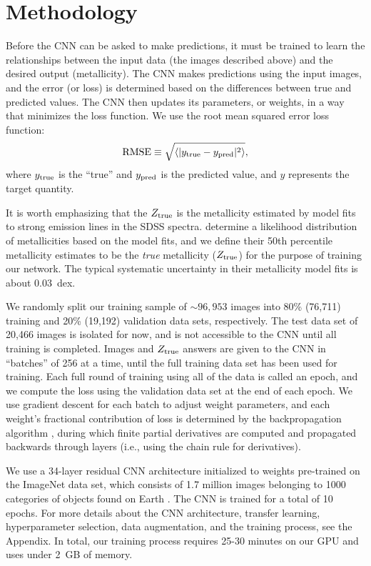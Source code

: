 \documentclass[fleqn,usenatbib]{mnras}
\begin{document}
\section{Methodology}\label{sec:training}
Before the CNN can be asked to make predictions, it must be trained to learn the relationships between the input data (the images described above) and the desired output (metallicity). The CNN makes predictions using the input images, and the error (or loss) is determined based on the differences between true and predicted values. The CNN then updates its parameters, or weights, in a way that minimizes the loss function. We use the root mean squared error loss function:
\begin{equation} \label{eq:rmse}
\mathrm{RMSE} \equiv \sqrt{\langle |y_{\rm true} - y_{\rm pred}|^2\rangle},
\end{equation}
where $y_{\rm true}$ is the ``true'' and $y_{\rm pred}$ is the predicted value, and $y$ represents the target quantity.

It is worth emphasizing that the $Z_{\rm true}$ is the metallicity estimated by model fits to strong emission lines in the SDSS spectra. \cite{Tremonti2004} determine a likelihood distribution of metallicities based on the model fits, and we define their 50th percentile metallicity estimates to be the \textit{true} metallicity ($Z_{\rm true}$) for the purpose of training our network. The typical systematic uncertainty in their metallicity model fits is about 0.03~dex.

We randomly split our training sample of $\sim 96,953$ images into 80\% (76,711) training and 20\% (19,192) validation data sets, respectively. The test data set of 20,466 images is isolated for now, and is not accessible to the CNN until all training is completed. Images and $Z_{\rm true}$ answers are given to the CNN in ``batches'' of 256 at a time, until the full training data set has been used for training. Each full round of training using all of the data is called an epoch, and we compute the loss using the validation data set at the end of each epoch. We use gradient descent for each batch to adjust weight parameters, and each weight's fractional contribution of loss is determined by the backpropagation algorithm \citep{LeCun1989}, during which finite partial derivatives are computed and propagated backwards through layers (i.e., using the chain rule for derivatives).

We use a 34-layer residual CNN architecture \citep{He2015} initialized to weights pre-trained on the ImageNet data set, which consists of 1.7 million images belonging to 1000 categories of objects found on Earth \citep[e.g., cats, horses, cars, or books;][]{ImageNet}. The CNN is trained for a total of 10 epochs. For more details about the CNN architecture, transfer learning, hyperparameter selection, data augmentation, and the training process, see the Appendix. In total, our training process requires 25-30 minutes on our GPU and uses under 2~GB of memory.
\end{document}

